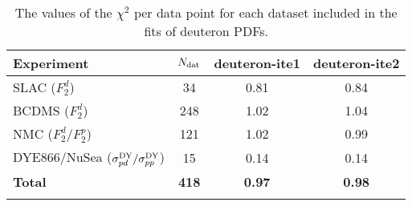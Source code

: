 \begin{table}[!t]
  \centering
  \scriptsize
  \renewcommand{\arraystretch}{1.13}
  \begin{tabularx}{\textwidth}{lCCC}
    \toprule
    \textbf{Experiment}
    & \textbf{$N_{\rm dat}$}
    &\textbf{ deuteron-ite1}
    & \textbf{deuteron-ite2}\\
    \midrule
    SLAC  ($F_2^d$)
    &      34   &      0.81   &      0.84   \\
    BCDMS ($F_2^d$)
    &     248   &      1.02   &      1.04   \\
    NMC   ($F_2^d/F_2^p$)
    &     121   &      1.02   &      0.99   \\
    DYE866/NuSea ($\sigma_{pd}^{\rm DY}/\sigma_{pp}^{\rm DY}$)
    &      15   &      0.14   &      0.14   \\
    \midrule
    {\bf Total } & {\bf 418} & {\bf 0.97} & {\bf 0.98} \\
    \bottomrule\\
  \end{tabularx}
  \caption{The values of the $\chi^2$ per data point for each dataset included
    in the fits of deuteron PDFs.}
  \label{tab:chi2-deut}
\end{table}
